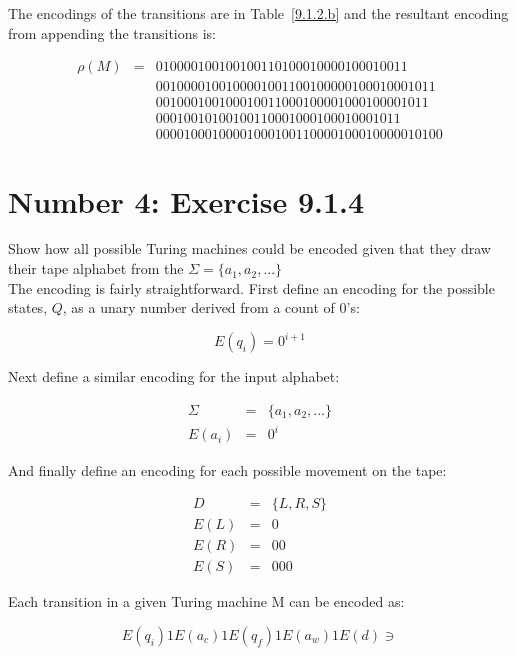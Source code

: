 \documentclass[12pt,a4paper,twoside]{article}  %
\begin{document}
The encodings of the transitions are in Table~\ref{9.1.2.b} and the
resultant encoding from appending the transitions is:

\begin{eqnarray}
\rho(M) &=& 010000100100100110100010000100010011 \nonumber\\
        &&  0010000100100001001100100000100010001011 \nonumber\\
        &&  001000100100010011000100001000100001011 \nonumber\\
        &&  00010010100100110001000100010001011 \nonumber\\
        &&  00001000100001000100110000100010000010100 \nonumber
\end{eqnarray}

\section{Number 4: Exercise 9.1.4}

Show how all possible Turing machines could be encoded given that they
draw their tape alphabet from the $\Sigma = \{a_1, a_2, ...\}$\\

The encoding is fairly straightforward. First define an encoding for
the possible states, $Q$, as a unary number derived from a count of
0's:

\begin{equation}
E(q_i) = 0^{i+1}
\end{equation}

Next define a similar encoding for the input alphabet:

\begin{eqnarray}
\Sigma &=& \{a_1, a_2, ...\} \\
E(a_i) &=& 0^i
\end{eqnarray}

And finally define an encoding for each possible movement on the tape:

\begin{eqnarray}
D    &=& \{L, R, S\} \\
E(L) &=& 0 \\
E(R) &=& 00 \\
E(S) &=& 000
\end{eqnarray}

Each transition in a given Turing machine M can be encoded as:

\begin{equation}
E(q_i)1E(a_c)1E(q_f)1E(a_w)1E(d) \ni
\end{equation}
\end{document}
